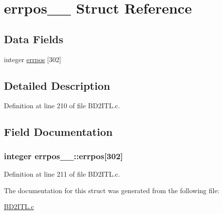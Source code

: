 \hypertarget{structerrpos__1__}{}\section{errpos\+\_\+\_\+ Struct Reference}
\label{structerrpos__1__}
\subsection*{Data Fields}
\begin{DoxyCompactItemize}
\item 
integer \hyperlink{structerrpos__1___a684fb82b750c03032f8d2970a1b81066}{errpos} \mbox{[}302\mbox{]}
\end{DoxyCompactItemize}


\subsection{Detailed Description}


Definition at line 210 of file B\+D2\+I\+T\+L.\+c.



\subsection{Field Documentation}
\subsubsection[{\texorpdfstring{errpos}{errpos}}]{\setlength{\rightskip}{0pt plus 5cm}integer errpos\+\_\+\_\+\+::errpos\mbox{[}302\mbox{]}}\hypertarget{structerrpos__1___a684fb82b750c03032f8d2970a1b81066}{}\label{structerrpos__1___a684fb82b750c03032f8d2970a1b81066}


Definition at line 211 of file B\+D2\+I\+T\+L.\+c.



The documentation for this struct was generated from the following file\+:\begin{DoxyCompactItemize}
\item 
\hyperlink{BD2ITL_8c}{B\+D2\+I\+T\+L.\+c}\end{DoxyCompactItemize}
